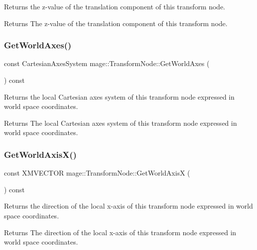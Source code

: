 Returns the z-\/value of the translation component of this transform node.

\begin{DoxyReturn}{Returns}
The z-\/value of the translation component of this transform node. 
\end{DoxyReturn}
\hypertarget{classmage_1_1_transform_node_ae49484fd95f20ada6c6b1100fd681c9c}{}\label{classmage_1_1_transform_node_ae49484fd95f20ada6c6b1100fd681c9c} 
\subsubsection{\texorpdfstring{Get\+World\+Axes()}{GetWorldAxes()}}
{\footnotesize\ttfamily const Cartesian\+Axes\+System mage\+::\+Transform\+Node\+::\+Get\+World\+Axes (\begin{DoxyParamCaption}{ }\end{DoxyParamCaption}) const}

Returns the local Cartesian axes system of this transform node expressed in world space coordinates.

\begin{DoxyReturn}{Returns}
The local Cartesian axes system of this transform node expressed in world space coordinates. 
\end{DoxyReturn}
\hypertarget{classmage_1_1_transform_node_a138fda019d9d42e483c5e50855e2df9f}{}\label{classmage_1_1_transform_node_a138fda019d9d42e483c5e50855e2df9f} 
\subsubsection{\texorpdfstring{Get\+World\+Axis\+X()}{GetWorldAxisX()}}
{\footnotesize\ttfamily const X\+M\+V\+E\+C\+T\+OR mage\+::\+Transform\+Node\+::\+Get\+World\+AxisX (\begin{DoxyParamCaption}{ }\end{DoxyParamCaption}) const}

Returns the direction of the local x-\/axis of this transform node expressed in world space coordinates.

\begin{DoxyReturn}{Returns}
The direction of the local x-\/axis of this transform node expressed in world space coordinates. 
\end{DoxyReturn}
\hypertarget{classmage_1_1_transform_node_a13b1b983327adec0f2960e4388d2e6a7}{}\label{classmage_1_1_transform_node_a13b1b983327adec0f2960e4388d2e6a7} 
